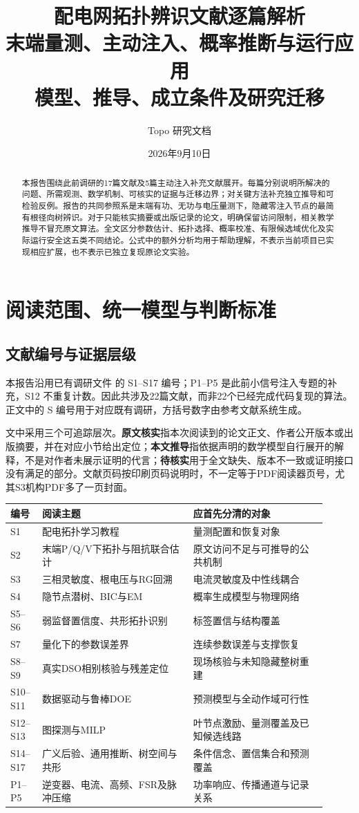 \documentclass[UTF8,11pt,fontset=fandol]{ctexart}
\title{配电网拓扑辨识文献逐篇解析\\[0.5em]\large 末端量测、主动注入、概率推断与运行应用\\模型、推导、成立条件及研究迁移}
\author{Topo 研究文档}
\date{2026年9月10日}
\theoremstyle{remark}
\numberwithin{equation}{section}
\begin{document}
\maketitle
\begin{abstract}
本报告围绕此前调研的17篇文献及5篇主动注入补充文献展开。每篇分别说明所解决的问题、所需观测、数学机制、可核实的证据与迁移边界；对关键方法补充独立推导和可检验反例。报告的共同参照系是末端有功、无功与电压量测下，隐藏零注入节点的最简有根径向树辨识。对于只能核实摘要或出版记录的论文，明确保留访问限制，相关教学推导不冒充原文算法。全文区分参数估计、拓扑选择、概率校准、有限候选域优化及实际运行安全这五类不同结论。公式中的额外分析均用于帮助理解，不表示当前项目已实现相应扩展，也不表示已独立复现原论文实验。
\end{abstract}
\tableofcontents
\clearpage

\section{阅读范围、统一模型与判断标准}
\subsection{文献编号与证据层级}
本报告沿用已有调研文件  的 S1--S17 编号；P1--P5 是此前小信号注入专题的补充，S12 不重复计数。因此共涉及22篇文献，而非22个已经完成代码复现的算法。正文中的 S 编号用于对应既有调研，方括号数字由参考文献系统生成。

文中采用三个可追踪层次。\textbf{原文核实}指本次阅读到的论文正文、作者公开版本或出版摘要，并在对应小节给出定位；\textbf{本文推导}指依据声明的数学模型自行展开的解释，不是对作者未展示证明的代言；\textbf{待核实}用于全文缺失、版本不一致或证明接口没有满足的部分。文献页码按印刷页码说明时，不一定等于PDF阅读器页号，尤其S3机构PDF多了一页封面。

\begin{longtable}{p{0.08\linewidth}p{0.44\linewidth}p{0.39\linewidth}}
\toprule 编号 & 阅读主题 & 应首先分清的对象\\\midrule\endhead
S1 & 配电拓扑学习教程 & 量测配置和恢复对象\\
S2 & 末端P/Q/V下拓扑与阻抗联合估计 & 原文访问不足与可推导的公共机制\\
S3 & 三相灵敏度、根电压与RG回溯 & 电流灵敏度及中性线耦合\\
S4 & 隐节点潜树、BIC与EM & 概率生成模型与物理网络\\
S5--S6 & 弱监督置信度、共形拓扑识别 & 标签置信与结构覆盖\\
S7 & 量化下的参数误差界 & 连续参数误差与支撑恢复\\
S8--S9 & 真实DSO相别核验与残差定位 & 现场核验与未知隐藏整树重建\\
S10--S11 & 数据驱动与鲁棒DOE & 预测模型与全动作域可行性\\
S12--S13 & 图探测与MILP & 叶节点激励、量测覆盖及已知候选线路\\
S14--S17 & 广义后验、通用推断、树空间与共形 & 条件信念、置信集合和预测覆盖\\
P1--P5 & 逆变器、电流、高频、FSR及脉冲压缩 & 功率响应、传播通道与记录关系\\
\bottomrule
\end{longtable}
\end{document}
